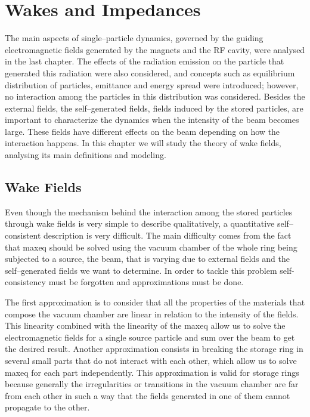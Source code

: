 \chapter{Wakes and Impedances}\label{cap:wakes_impedances}

    The main aspects of single--particle dynamics, governed by the guiding electromagnetic fields generated by the magnets and the RF cavity, were analysed in the last chapter. The effects of the radiation emission on the particle that generated this radiation were also considered, and concepts such as equilibrium distribution of particles, emittance and energy spread were introduced; however, no interaction among the particles in this distribution was considered. Besides the external fields, the self--generated fields, fields induced by the stored particles, are important to characterize the dynamics when the intensity of the beam becomes large. These fields have different effects on the beam depending on how the interaction happens. In this chapter we will study the theory of wake fields, analysing its main definitions and modeling.

\section{Wake Fields}\label{sec:wake_fields}

    Even though the mechanism behind the interaction among the stored particles through wake fields is very simple to describe qualitatively, a quantitative self--consistent description is very difficult. The main difficulty comes from the fact that \gls{maxeq} should be solved using the vacuum chamber of the whole ring being subjected to a source, the beam, that is varying due to external fields and the self--generated fields we want to determine. In order to tackle this problem self-consistency must be forgotten and approximations must be done.

    The first approximation is to consider that all the properties of the materials that compose the vacuum chamber are linear in relation to the intensity of the fields. This linearity combined with the linearity of the \gls{maxeq} allow us to solve the electromagnetic fields for a single source particle and sum over the beam to get the desired result. Another approximation consists in breaking the storage ring in several small parts that do not interact with each other, which allow us to solve \gls{maxeq} for each part independently. This approximation is valid for storage rings because generally the irregularities or transitions in the vacuum chamber are far from each other in such a way that the fields generated in one of them cannot propagate to the other.

